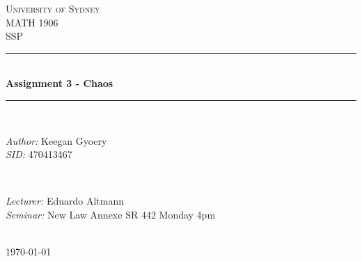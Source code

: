 \documentclass[a4paper]{article}
\begin{document}
\begin{titlepage}

\newcommand{\HRule}{\rule{\linewidth}{0.5mm}} %

\center %
 
\textsc{\LARGE University of Sydney}\\[1.5cm] %
\textsc{\Large MATH 1906}\\[0.5cm] %
\textsc{\large SSP}\\[0.5cm] %

\HRule \\[0.4cm]
{ \huge \bfseries Assignment 3 - Chaos}\\[0.4cm] %
\HRule \\[1.5cm]

\begin{minipage}{0.4\textwidth}
\begin{flushleft} \large
\emph{Author:}
Keegan Gyoery %
\\
\emph{SID:}
470413467
\end{flushleft}
\end{minipage}
~
\begin{minipage}{0.4\textwidth}
\begin{flushright} \large
\emph{Lecturer:} 
Eduardo Altmann %
\\
\emph{Seminar:}
New Law Annexe SR 442
Monday 4pm
\end{flushright}
\end{minipage}\\[4cm]

{\large \today}\\[3cm] %

\vfill %

\end{titlepage}

\end{document}
